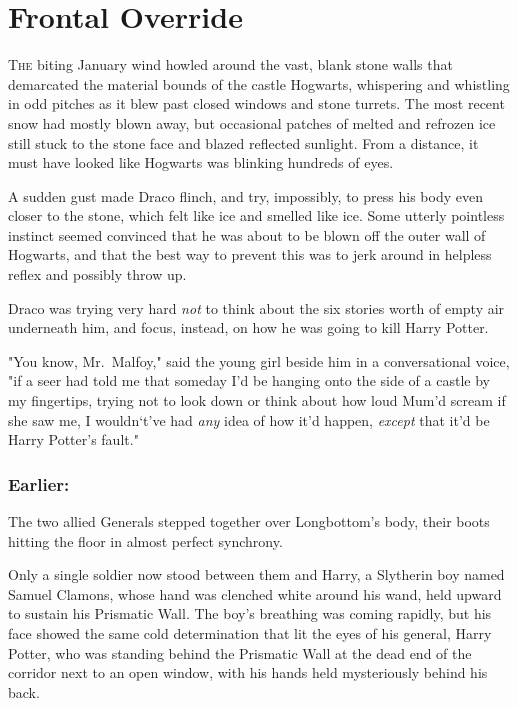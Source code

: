\chapter{Frontal Override}

\lettrine{T}{he} biting 
January wind howled around the vast, blank stone walls that demarcated the 
material bounds of the castle Hogwarts, whispering and whistling in odd pitches 
as it blew past closed windows and stone turrets. The most recent snow had 
mostly blown away, but occasional patches of melted and refrozen ice still 
stuck to the stone face and blazed reflected sunlight. From a distance, it must 
have looked like Hogwarts was blinking hundreds of eyes.

A sudden gust made Draco flinch, and try, impossibly, to press his body even 
closer to the stone, which felt like ice and smelled like ice. Some utterly 
pointless instinct seemed convinced that he was about to be blown off the outer 
wall of Hogwarts, and that the best way to prevent this was to jerk around in 
helpless reflex and possibly throw up.

Draco was trying very hard \emph{not} to think about the six stories worth of 
empty air underneath him, and focus, instead, on how he was going to kill Harry 
Potter.

"You know, Mr.~Malfoy," said the young girl beside him in a conversational 
voice, "if a seer had told me that someday I'd be hanging onto the side of a 
castle by my fingertips, trying not to look down or think about how loud Mum'd 
scream if she saw me, I wouldn`t've had \emph{any} idea of how it'd happen, 
\emph{except} that it'd be Harry Potter's fault."
\sbreak
\subsection{Earlier:}

The two allied Generals stepped together over Longbottom's body, their boots 
hitting the floor in almost perfect synchrony.

Only a single soldier now stood between them and Harry, a Slytherin boy named 
Samuel Clamons, whose hand was clenched white around his wand, held upward to 
sustain his Prismatic Wall. The boy's breathing was coming rapidly, but his 
face showed the same cold determination that lit the eyes of his general, Harry 
Potter, who was standing behind the Prismatic Wall at the dead end of the 
corridor next to an open window, with his hands held mysteriously behind his 
back.


